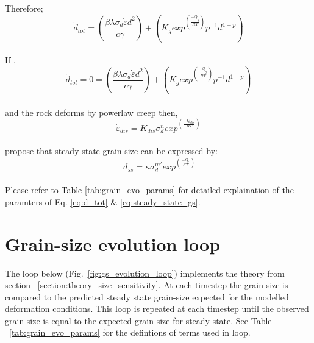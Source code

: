 \documentclass[]{scrreprt}
\begin{document}
Therefore; \:
\begin{equation}
 \label{eq:d_tot}
\dot{d}_{tot} = \left(\frac{\beta\lambda\sigma_{d}\dot{\varepsilon}d^2}{c\gamma}\right) + \left(K_g exp^{\left(\frac{-Q_g}{RT}\right)} p^{-1} d^{1-p}\right)
\end{equation}\\

If , \: 
\begin{equation}
 \label{eq:d_tot_0}
\dot{d}_{tot} = 0 = \left(\frac{\beta\lambda\sigma_{d}\dot{\varepsilon}d^2}{c\gamma}\right) + \left(K_g exp^{\left(\frac{-Q_g}{RT}\right)} p^{-1} d^{1-p}\right)
\end{equation}\\

and the rock deforms by powerlaw creep then, \:
\begin{equation}
 \label{eq:dislocation_creep}
\dot{\varepsilon}_{dis} = K_{dis} \sigma_d^n exp^{\left(\frac{-Q_{dis}}{RT}\right)}
\end{equation}\\

\citet{Austin2007} propose that steady state grain-size can be expressed by: \:
\begin{equation}
 \label{eq:steady_state_gs}
\ d_{ss} = \kappa \sigma_d^{m'} exp^{\left(\frac{-Q_{'}}{RT}\right)}
\end{equation}\\

Please refer to Table \ref{tab:grain_evo_params} for detailed explaination of the paramters of Eq. \ref{eq:d_tot} \& \ref{eq:steady_state_gs}.\\


\section{Grain-size evolution loop}
\label{section:gs_evolution_loop}
The loop below (Fig.~\ref{fig:gs_evolution_loop}) implements the theory from section ~\ref{section:theory_size_sensitivity}. At each timestep the grain-size is compared to the predicted steady state grain-size expected for the modelled deformation conditions. This loop is repeated at each timestep until the observed grain-size is equal to the expected grain-size for steady state. See Table ~\ref{tab:grain_evo_params} for the defintions of terms used in loop.\\
\end{document}
